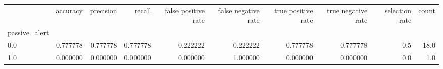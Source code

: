 \begin{tabular}{lrrrrrrrrr}
\toprule
{} &  accuracy &  precision &    recall &  false positive rate &  false negative rate &  true positive rate &  true negative rate &  selection rate &  count \\
passive\_alert &           &            &           &                      &                      &                     &                     &                 &        \\
\midrule
0.0           &  0.777778 &   0.777778 &  0.777778 &             0.222222 &             0.222222 &            0.777778 &            0.777778 &             0.5 &   18.0 \\
1.0           &  0.000000 &   0.000000 &  0.000000 &             0.000000 &             1.000000 &            0.000000 &            0.000000 &             0.0 &    1.0 \\
\bottomrule
\end{tabular}
